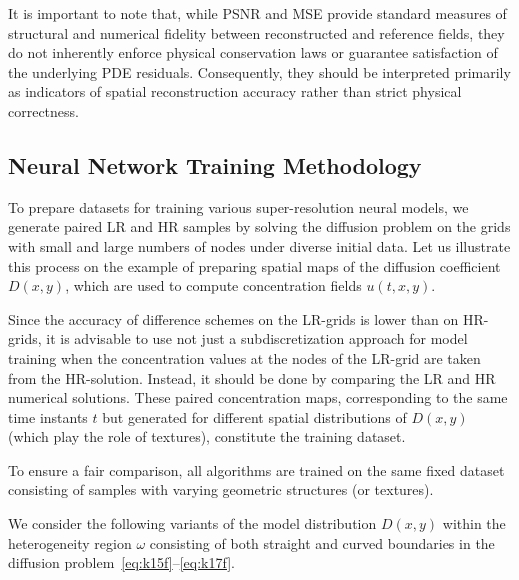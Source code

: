 \documentclass{ieeeaccess}
\begin{document}
It is important to note that, while PSNR and MSE provide standard measures of structural and numerical fidelity between reconstructed and reference fields, they do not inherently enforce physical conservation laws or guarantee satisfaction of the underlying PDE residuals. Consequently, they should be interpreted primarily as indicators of spatial reconstruction accuracy rather than strict physical correctness.



\subsection{Neural Network Training Methodology}

To prepare datasets for training various super-resolution neural models, we generate paired LR and HR samples by solving the diffusion problem on the grids with small and large numbers of nodes under diverse initial data. 
Let us illustrate this process on the example of preparing spatial maps of the diffusion coefficient $D(x, y)$, which are used to compute concentration fields $u(t,x,y)$.

Since the accuracy of difference schemes on the LR-grids is lower than on HR-grids, it is advisable to use not just a subdiscretization approach for model training when the concentration values at the nodes of the LR-grid are taken from the HR-solution. Instead, it should be done by comparing the LR and HR numerical solutions. 
These paired concentration maps, corresponding to the same time instants $t$ but generated for different spatial distributions of $D(x,y)$ (which play the role of textures), constitute the training dataset.
 
To ensure a fair comparison, all algorithms are trained on the same fixed dataset consisting of samples with varying geometric structures (or textures).

We consider the following variants of the model distribution $D(x, y)$  within the heterogeneity region $\omega$ consisting of  both straight and curved boundaries  in the diffusion problem~\eqref{eq:k15f}–\eqref{eq:k17f}.
\end{document}
